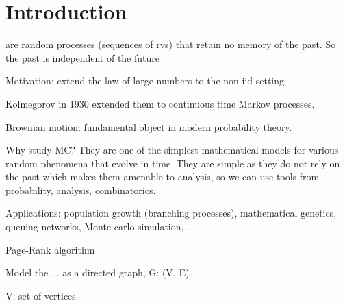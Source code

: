 \section{Introduction}
 are random processes (sequences of rvs) that retain no memory of the past.
So the past is independent of the future

Motivation: extend the law of large numbers to the non iid setting

Kolmegorov in 1930 extended them to continuous time Markov processes.

Brownian motion: fundamental object in modern probability theory.

Why study MC?
They are one of the simplest mathematical models for various random phenomena that evolve in time.
They are simple as they do not rely on the past which makes them amenable to analysis, so we can use tools from probability, analysis, combinatorics.

Applications: population growth (branching processes), mathematical genetics, queuing networks, Monte carlo simulation, \dots

Page-Rank algorithm

Model the ... as a directed graph, G: (V, E)

V: set of vertices